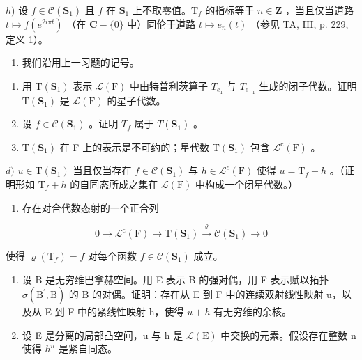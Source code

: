 \(h)\) 设 \(f \in \mathcal{C}(\mathbf{S}_1)\) 且 \(f\) 在 \(\mathbf{S}_1\) 上不取零值。\(\mathrm{T}_f\) 的指标等于 \(n \in \mathbf{Z}\) ，当且仅当道路 \(t \mapsto f(e^{2i\pi t})\) （在 \(\mathbf{C} - \{0\}\) 中）同伦于道路 \(t \mapsto e_n(t)\) （参见 TA, III, p. 229, 定义 1）。

\begin{enumerate}
\def\labelenumi{\arabic{enumi})}
\setcounter{enumi}{7}
\tightlist
\item
  我们沿用上一习题的记号。
\end{enumerate}

\begin{enumerate}
\def\labelenumi{\alph{enumi})}
\item
  用 \(\mathrm{T}(\mathbf{S}_{1})\) 表示 \(\mathcal{L}(\mathrm{F})\) 中由特普利茨算子 \(T_{e_{1}}\) 与 \(T_{e_{-1}}\) 生成的闭子代数。证明 \(\mathrm{T}(\mathbf{S}_{1})\) 是 \(\mathcal{L}(\mathrm{F})\) 的星子代数。
\item
  设 \(f \in \mathcal{C}(\mathbf{S}_1)\) 。证明 \(T_f\) 属于 \(T(\mathbf{S}_1)\) 。
\item
  \(\mathrm{T}(\mathbf{S}_{1})\) 在 F 上的表示是不可约的；星代数 \(\mathrm{T}(\mathbf{S}_{1})\) 包含 \(\mathcal{L}^{\mathrm{c}}(\mathrm{F})\) 。
\end{enumerate}

\(d)\) \(u \in \mathrm{T}(\mathbf{S}_1)\) 当且仅当存在 \(f \in \mathcal{C}(\mathbf{S}_1)\) 与 \(h \in \mathcal{L}^c(\mathrm{F})\) 使得 \(u = \mathrm{T}_f + h\) 。（证明形如 \(\mathrm{T}_f + h\) 的自同态所成之集在 \(\mathcal{L}(\mathrm{F})\) 中构成一个闭星代数。）

\begin{enumerate}
\def\labelenumi{\alph{enumi})}
\setcounter{enumi}{4}
\tightlist
\item
  存在对合代数态射的一个正合列
\end{enumerate}

\[
0 \longrightarrow \mathcal {L} ^ {\mathrm{c}} (\mathrm{F}) \longrightarrow \mathrm{T} (\mathbf {S} _ {1}) \stackrel {\varrho} {\longrightarrow} \mathcal {C} (\mathbf {S} _ {1}) \longrightarrow 0
\]

使得 \(\varrho(\mathrm{T}_f) = f\) 对每个函数 \(f \in \mathcal{C}(\mathbf{S}_1)\) 成立。

\begin{enumerate}
\def\labelenumi{\arabic{enumi})}
\setcounter{enumi}{8}
\item
  设 B 是无穷维巴拿赫空间。用 E 表示 B 的强对偶，用 F 表示赋以拓扑 \(\sigma(\mathrm{B}^{\prime},\mathrm{B})\) 的 B 的对偶。证明：存在从 E 到 F 中的连续双射线性映射 u，以及从 E 到 F 中的紧线性映射 h，使得 \(u + h\) 有无穷维的余核。
\item
  设 E 是分离的局部凸空间，u 与 h 是 \(\mathcal{L}(\mathrm{E})\) 中交换的元素。假设存在整数 n 使得 \(h^{n}\) 是紧自同态。
\end{enumerate}

